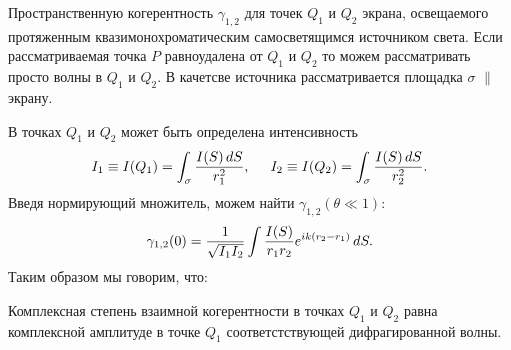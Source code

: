 Пространственную когерентность $\gamma_{1, 2}$ для точек $Q_1$ и $Q_2$ экрана, освещаемого протяженным квазимонохроматическим самосветящимся источником света. Если рассматриваемая точка $P$ равноудалена от $Q_1$ и $Q_2$ то можем рассматривать просто волны в $Q_1$ и $Q_2$. В качетсве источника рассматривается площадка $\sigma$ $\parallel$ экрану. 


В точках $Q_1$ и $Q_2$ может быть определена интенсивность
\begin{equation*}
    I_1 \equiv I(Q_1) = \int_\sigma \frac{I(S) \, d S}{r_1^2}, \hspace{5 mm} 
    I_2 \equiv I(Q_2) = \int_\sigma \frac{I(S) \, d S}{r_2^2}.
\end{equation*}
Введя нормирующий множитель, можем найти $\gamma_{1,2} (\theta \ll 1)$:
\begin{equation*}
    \gamma_{1,2} (0) = \frac{1}{\sqrt{I_1 I_2}} \int \frac{I(S)}{r_1 r_2} e^{ik (r_2-r_1)} \, d S.
\end{equation*}
Таким образом мы говорим, что:

\begin{to_thr}
    Комплексная степень взаимной когерентности в точках $Q_1$ и $Q_2$ равна комплексной амплитуде в точке $Q_1$ соответстствующей дифрагированной волны.
\end{to_thr}